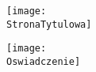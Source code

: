 
\pagestyle{empty}
\begin{figure*}[h!tb]
\vspace*{-2.5cm}
\hspace*{-3.5cm}
	\centering
	\texttt{[image: \\StronaTytulowa]}
\end{figure*}
\clearpage
\newpage
\thispagestyle{empty}
\mbox{}
\pagestyle{empty}
\begin{figure*}[h!tb]
\vspace*{-2.5cm}
\hspace*{-3.5cm}
	\centering
	\texttt{[image: \\Oswiadczenie]}
\end{figure*}
\clearpage
\newpage
\thispagestyle{empty}
\mbox{}
\clearpage